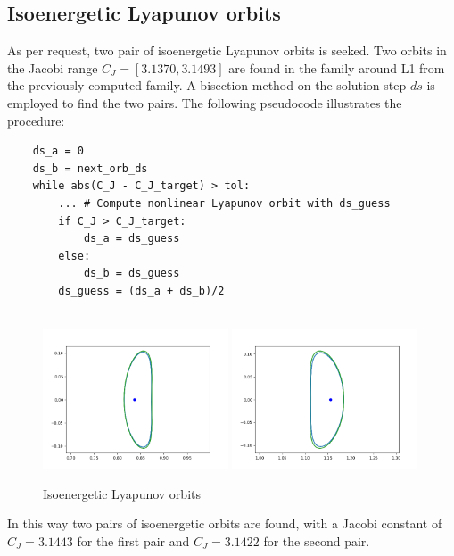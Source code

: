 \documentclass{report}
\begin{document}
\subsection*{Isoenergetic Lyapunov orbits}
As per request, two pair of isoenergetic Lyapunov orbits is seeked. Two orbits in the Jacobi range
$C_J = [3.1370, 3.1493]$ are found in the family around L1 from the previously computed family. 
A bisection method on the solution step $ds$ is employed to find the two pairs. The following pseudocode illustrates the procedure:
\begin{verbatim}
    ds_a = 0
    ds_b = next_orb_ds
    while abs(C_J - C_J_target) > tol:
        ... # Compute nonlinear Lyapunov orbit with ds_guess
        if C_J > C_J_target:
            ds_a = ds_guess
        else:
            ds_b = ds_guess
        ds_guess = (ds_a + ds_b)/2
   
\end{verbatim}
\begin{figure}[h]
    \centering
    \includegraphics[width=0.49\textwidth]{images/isoL1.png}
    \includegraphics[width=0.49\textwidth]{images/isoL2.png}
    \caption{Isoenergetic Lyapunov orbits}
\end{figure}
In this way two pairs of isoenergetic orbits are found,
with a Jacobi constant of $C_J = 3.1443$ for the first pair and $C_J = 3.1422$ for the second pair.\\\\
\end{document}
